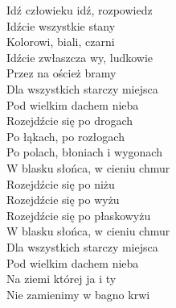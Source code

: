 
\begin{flushleft}
Idź człowieku idź, rozpowiedz \tab{} \\
Idźcie wszystkie stany \tab{}  \\
Kolorowi, biali, czarni  \tab{} \\
Idźcie zwłaszcza wy, ludkowie  \tab{} \\
Przez na oścież bramy  \tab{}  \\
\vskip 3mm
\hspace{0.9cm}Dla wszystkich starczy miejsca   \\
\hspace{0.9cm}Pod wielkim dachem nieba   \\
\vskip 3mm
Rozejdźcie się po drogach  \tab{} \\
Po łąkach, po rozłogach \tab{}  \\
Po polach, błoniach i wygonach  \\
W blasku słońca, w cieniu chmur   \\
\vskip 3mm
\hspace{0.9cm}Rozejdźcie się po niżu \tab{}  \\
\hspace{0.9cm}Rozejdźcie się po wyżu \tab{}  \\
\hspace{0.9cm}Rozejdźcie się po płaskowyżu  \\
\hspace{0.9cm}W blasku słońca, w cieniu chmur   \\
\vskip 3mm
Dla wszystkich starczy miejsca  \\
Pod wielkim dachem nieba  \tab{}  \\
Na ziemi której ja i ty  \tab{}  \\
Nie zamienimy w bagno krwi  \tab{}   \\
\end{flushleft}
\clearpage
